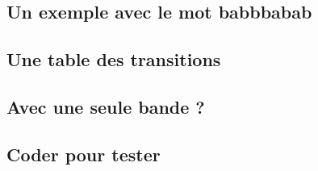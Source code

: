 \subsection{Un exemple avec le mot babbbabab}

    


\subsection{Une table des transitions}

    


\subsection{Avec une seule bande ?}

    


\subsection{Coder pour tester}

    
